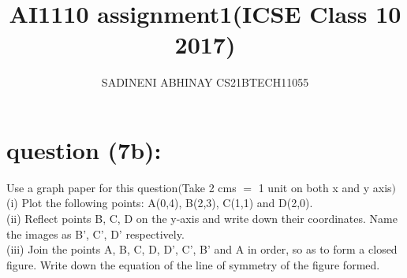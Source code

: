 \documentclass[11pt, letterpaper]{article}
\title{AI1110 assignment1(ICSE Class 10 2017)}
\author{SADINENI ABHINAY CS21BTECH11055}
\begin{document}
 \maketitle
\section{question (7b):}
\begin{LARGE}
Use a graph paper for this question$ ($Take 2 cms $=$ 1 unit on both x and y axis$)$\\
(i) Plot the following points:
A(0,4), B(2,3), C(1,1) and D(2,0).\\

(ii) Reflect points B, C, D on the y-axis and write down their coordinates. Name
the images as B', C', D' respectively.\\

(iii) Join the points A, B, C, D, D', C', B' and A in order, so as to form a closed
figure. Write down the equation of the line of symmetry of the figure formed.\\
\end{LARGE}
\pagebreak
\end{document}

